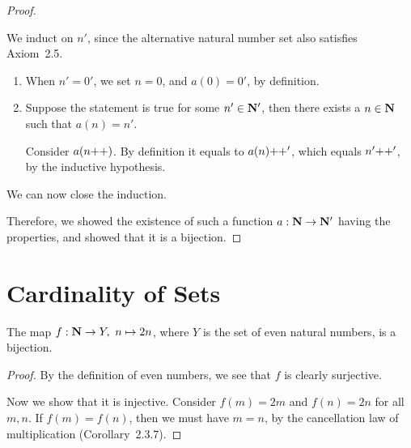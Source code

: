 \begin{proof}
\begin{enumerate}
	We induct on $n'$, since the alternative natural number set also satisfies Axiom~2.5.
	\begin{enumerate}
		\item \mybcbox When $n' = 0'$, we set $n = 0$, and $a(0) = 0'$, by definition.
		
		\item \myisbox Suppose the statement is true for some $n' \in \mathbf{N}'$, then there exists a $n \in \mathbf{N}$ such that $a(n) = n'$. 
		
		Consider $a(n{+}{+})$. By definition it equals to $a(n){+}{+}'$, which equals $n'{+}{+}'$, by the inductive hypothesis.
	\end{enumerate}

	We can now close the induction.
\end{enumerate}

	Therefore, we showed the existence of such a function $a: \mathbf{N} \to \mathbf{N}'$ having the properties, and showed that it is a bijection.
\end{proof}

\section{Cardinality of Sets}
\begin{why}{58}
	The map $f: \mathbf{N} \to Y,\ n \mapsto 2n$, where $Y$ is the set of even natural numbers, is a bijection.
\end{why}
\begin{proof}
	By the definition of even numbers, we see that $f$ is clearly surjective. 
	
	Now we show that it is injective. Consider $f(m) = 2m$ and $f(n) = 2n$ for all $m,n$. If $f(m) = f(n)$, then we must have $m = n$, by the cancellation law of multiplication (Corollary~2.3.7).
\end{proof}

